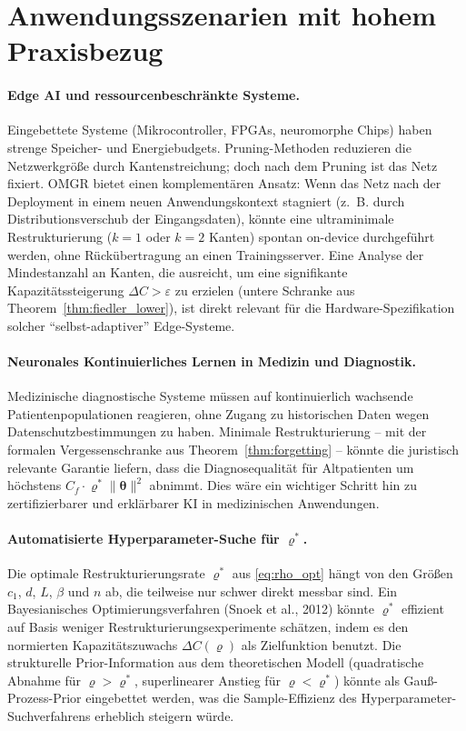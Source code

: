 \documentclass[12pt, a4paper, openany]{report}
\newcommand{\eps}{\varepsilon}
\begin{document}
\section{Anwendungsszenarien mit hohem Praxisbezug}
\label{sec:outlook_applications}

\paragraph{Edge AI und ressourcenbeschränkte Systeme.}
Eingebettete Systeme (Mikrocontroller, FPGAs, neuromorphe Chips) haben
strenge Speicher- und Energiebudgets.  Pruning-Methoden reduzieren die
Netzwerkgröße durch Kantenstreichung; doch nach dem Pruning ist das Netz
fixiert.  OMGR bietet einen komplementären Ansatz: Wenn das Netz nach der
Deployment in einem neuen Anwendungskontext stagniert (z.~B. durch
Distributionsverschub der Eingangsdaten), könnte eine ultraminimale
Restrukturierung ($k = 1$ oder $k = 2$ Kanten) spontan on-device durchgeführt
werden, ohne Rückübertragung an einen Trainingsserver.  Eine Analyse der
Mindestanzahl an Kanten, die ausreicht, um eine signifikante
Kapazitätssteigerung $\Delta C > \eps$ zu erzielen (untere Schranke aus
Theorem~\ref{thm:fiedler_lower}), ist direkt relevant für die
Hardware-Spezifikation solcher ``selbst-adaptiver'' Edge-Systeme.

\paragraph{Neuronales Kontinuierliches Lernen in Medizin und Diagnostik.}
Medizinische diagnostische Systeme müssen auf kontinuierlich wachsende
Patientenpopulationen reagieren, ohne Zugang zu historischen Daten wegen
Datenschutzbestimmungen zu haben.  Minimale Restrukturierung -- mit der
formalen Vergessenschranke aus Theorem~\ref{thm:forgetting} -- könnte
die juristisch relevante Garantie liefern, dass die Diagnosequalität für
Altpatienten um höchstens $C_f \cdot \varrho^* \|\bm{\theta}\|^2$ abnimmt.
Dies wäre ein wichtiger Schritt hin zu zertifizierbarer und erklärbarer
KI in medizinischen Anwendungen.

\paragraph{Automatisierte Hyperparameter-Suche für $\varrho^*$.}
Die optimale Restrukturierungsrate $\varrho^*$ aus \eqref{eq:rho_opt}
hängt von den Größen $c_1$, $d$, $L$, $\beta$ und $n$ ab, die
teilweise nur schwer direkt messbar sind.  Ein Bayesianisches
Optimierungsverfahren (Snoek et al., 2012) könnte $\varrho^*$ effizient
auf Basis weniger Restrukturierungsexperimente schätzen, indem es den
normierten Kapazitätszuwachs $\Delta C(\varrho)$ als Zielfunktion
benutzt.  Die strukturelle Prior-Information aus dem theoretischen Modell
(quadratische Abnahme für $\varrho > \varrho^*$, superlinearer Anstieg
für $\varrho < \varrho^*$) könnte als Gauß-Prozess-Prior eingebettet
werden, was die Sample-Effizienz des Hyperparameter-Suchverfahrens
erheblich steigern würde.
\end{document}
